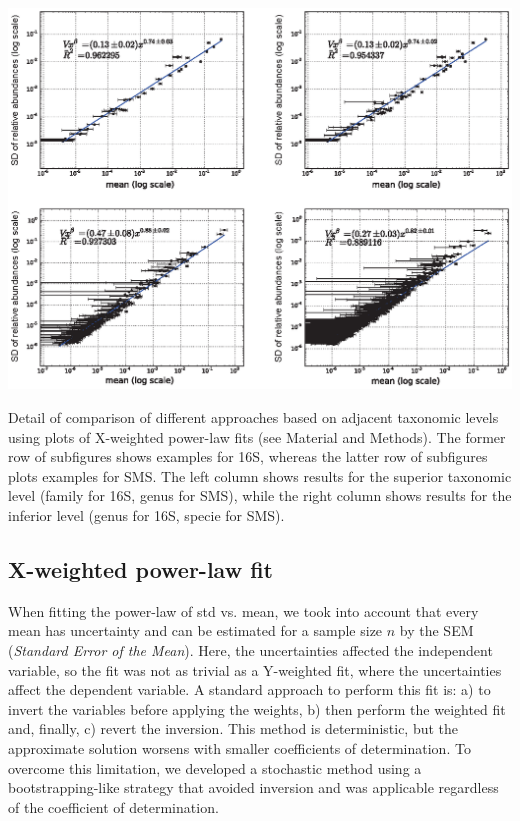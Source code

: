 \begin{supfig} 
  \includegraphics[width=1.0\textwidth]{figs/supfig_taxlev2.eps}
\caption{Detail of comparison of different approaches based on adjacent taxonomic levels using plots of X-weighted power-law fits (see Material and Methods). The former row of subfigures shows examples for 16S, whereas the latter row of subfigures plots examples for SMS. The left column shows results for the superior taxonomic level (family for 16S, genus for SMS), while the right column shows results for the inferior level (genus for 16S, specie for SMS).}
\label{supfig:taxlev2}
\end{supfig}

\subsection*{X-weighted power-law fit}\label{sec:X-w}

When fitting the power-law of std vs. mean, we took into account that every mean has uncertainty and can be estimated for a sample size $n$ by the SEM (\emph{Standard Error of the Mean}). Here, the uncertainties affected the independent variable, so the fit was not as trivial as a Y-weighted fit, where the uncertainties affect the dependent variable. A standard approach to perform this fit is: a) to invert the variables before applying the weights, b) then perform the weighted fit and, finally, c) revert the inversion. This method is deterministic, but the approximate solution worsens with smaller coefficients of determination. To overcome this limitation, we developed a stochastic method using a bootstrapping-like strategy that avoided inversion and was applicable regardless of the coefficient of determination.

